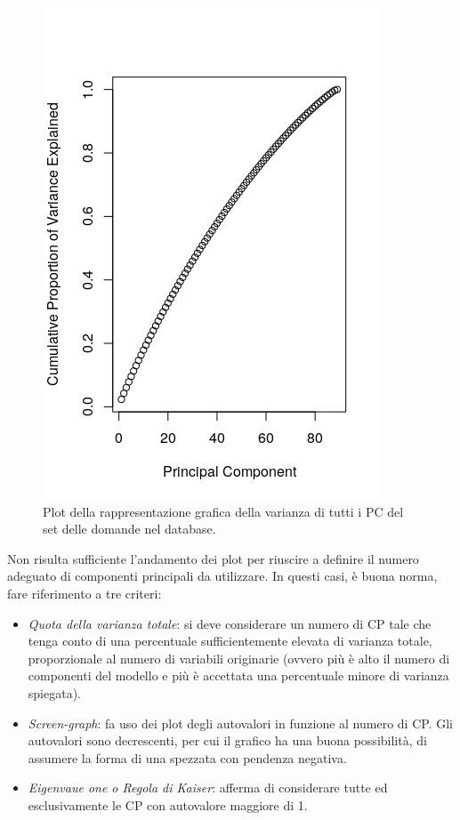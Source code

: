 \begin{figure}[H]
\centering
	\includegraphics[width=0.60\linewidth]{../../PCA/plot/variances2-ALL_rete-db.png}
	\caption{Plot della rappresentazione grafica della varianza di tutti i PC del set delle domande nel database.}
	\label{Plot della rappresentazione grafica della varianza di tutti i PC del set delle domande nel database.}
\end{figure}
Non risulta sufficiente l'andamento dei plot per riuscire a definire il numero adeguato di componenti principali da utilizzare. In questi casi, \`e buona norma, fare riferimento a tre criteri:
\begin{itemize}
\item \textit{Quota della varianza totale}: si deve considerare un numero di CP tale che tenga conto di una percentuale sufficientemente elevata di varianza totale, proporzionale al numero di variabili originarie (ovvero pi\`u \`e alto il numero di componenti del modello e pi\`u \`e accettata una percentuale minore di varianza spiegata).
\item \textit{Screen-graph}: fa uso dei plot degli autovalori in funzione al numero di CP. Gli autovalori sono decrescenti, per cui il grafico ha una buona possibilit\`a, di assumere la forma di una spezzata con pendenza negativa.
\item \textit{Eigenvaue one o Regola di Kaiser}: afferma di considerare tutte ed esclusivamente le CP con autovalore maggiore di 1.
\end{itemize}
